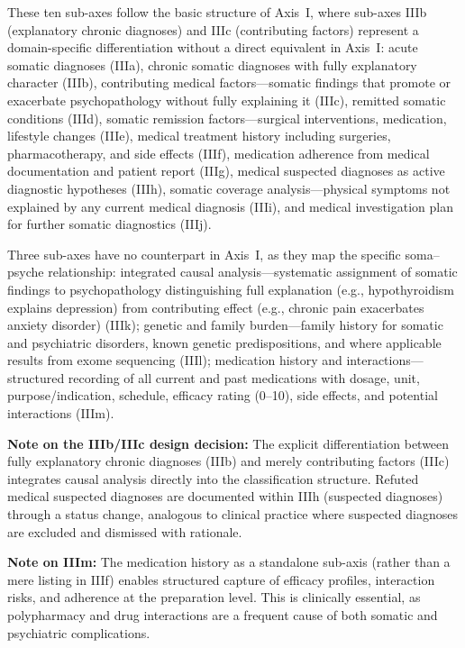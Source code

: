\documentclass[11pt,a4paper]{article}
\begin{document}
\begin{description}[style=nextline, leftmargin=1.5cm, font=\bfseries]
\item[IIIa--IIIj: Parallel Core Structure] These ten sub-axes follow the basic structure of Axis~I, where sub-axes IIIb (explanatory chronic diagnoses) and IIIc (contributing factors) represent a domain-specific differentiation without a direct equivalent in Axis~I: acute somatic diagnoses (IIIa), chronic somatic diagnoses with fully explanatory character (IIIb), contributing medical factors---somatic findings that promote or exacerbate psychopathology without fully explaining it (IIIc), remitted somatic conditions (IIId), somatic remission factors---surgical interventions, medication, lifestyle changes (IIIe), medical treatment history including surgeries, pharmacotherapy, and side effects (IIIf), medication adherence from medical documentation and patient report (IIIg), medical suspected diagnoses as active diagnostic hypotheses (IIIh), somatic coverage analysis---physical symptoms not explained by any current medical diagnosis (IIIi), and medical investigation plan for further somatic diagnostics (IIIj).
\item[IIIk--IIIm: Axis-III-Specific Sub-Axes] Three sub-axes have no counterpart in Axis~I, as they map the specific soma--psyche relationship: integrated causal analysis---systematic assignment of somatic findings to psychopathology distinguishing full explanation (e.g., hypothyroidism explains depression) from contributing effect (e.g., chronic pain exacerbates anxiety disorder) (IIIk); genetic and family burden---family history for somatic and psychiatric disorders, known genetic predispositions, and where applicable results from exome sequencing (IIIl); medication history and interactions---structured recording of all current and past medications with dosage, unit, purpose/indication, schedule, efficacy rating (0--10), side effects, and potential interactions (IIIm).
\end{description}

\textbf{Note on the IIIb/IIIc design decision:} The explicit differentiation between fully explanatory chronic diagnoses (IIIb) and merely contributing factors (IIIc) integrates causal analysis directly into the classification structure. Refuted medical suspected diagnoses are documented within IIIh (suspected diagnoses) through a status change, analogous to clinical practice where suspected diagnoses are excluded and dismissed with rationale.

\textbf{Note on IIIm:} The medication history as a standalone sub-axis (rather than a mere listing in IIIf) enables structured capture of efficacy profiles, interaction risks, and adherence at the preparation level. This is clinically essential, as polypharmacy and drug interactions are a frequent cause of both somatic and psychiatric complications.
\end{document}
